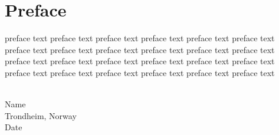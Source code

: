 \section*{\Huge Preface}

preface text preface text preface text preface text preface text preface text preface text preface text preface text preface text preface text preface text preface text preface text preface text preface text preface text preface text preface text preface text preface text preface text preface text preface text 
\\
\\
\begin{minipage}{0.95\textwidth}
\begin{flushright}
Name \\
Trondheim, Norway \\
Date
\end{flushright}
\end{minipage}\\[4cm]


\listoftodos[Notes]

\clearpage